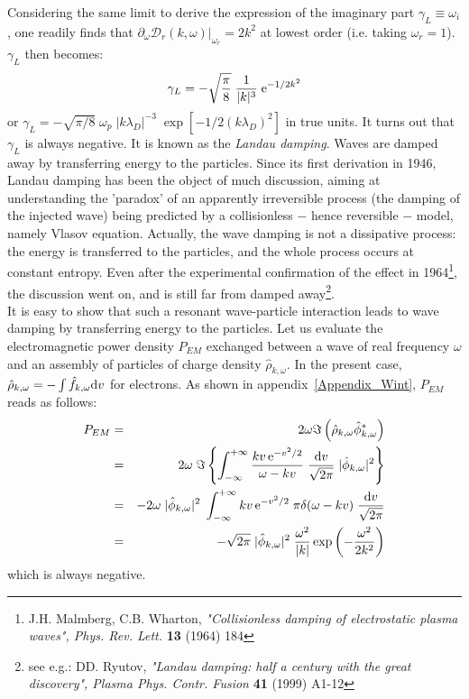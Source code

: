\documentclass[11pt]{article}
\newcommand{\dd}{\textrm d}
\newcommand{\ee}{\textrm e}
\newcommand{\beq}{\begin{equation}}
\newcommand{\eeq}{\end{equation}}
\newcommand{\beqas}{\begin{eqnarray*}}
\newcommand{\eeqas}{\end{eqnarray*}}
\begin{document}
Considering the same limit to derive the expression of the imaginary part $\gamma_L \equiv \omega_i$, one readily finds that $\left.\partial_\omega\mathcal{D}_r(k,\omega)\right|_{\omega_r} = 2k^2$ at lowest order (i.e. taking $\omega_r=1$). $\gamma_L$ then becomes:
\beq
\gamma_L = - \sqrt{\frac{\pi}{8}}\; \frac{1}{|k|^3}\; \ee^{-1/2k^2}
\eeq
or $\gamma_L = - \sqrt{\pi/8}\; \omega_p\; |k\lambda_D|^{-3}\; \exp\left[ -1/2(k\lambda_D)^2 \right]$ in true units. It turns out that $\gamma_L$ is always negative. It is
known as the \emph{Landau damping}. Waves are damped away by transferring
energy to the particles. Since its first derivation in 1946, Landau damping has been the object of much discussion, aiming at understanding the 'paradox' of an apparently irreversible process (the damping of the injected wave) being predicted by a collisionless $-$ hence reversible $-$ model, namely Vlasov equation. Actually, the wave damping is not a dissipative process: the energy is transferred to the particles, and the whole process occurs at constant entropy. Even after the experimental confirmation of the effect in 1964\footnote{ J.H. Malmberg, C.B. Wharton, \emph{"Collisionless damping of electrostatic plasma waves", Phys. Rev. Lett.} {\bf 13} (1964) 184}, the discussion went on, and is still far from damped away\footnote{ see e.g.: DD. Ryutov, \emph{"Landau damping: half a century with the great discovery", Plasma Phys. Contr. Fusion} {\bf 41} (1999) A1-12}. \\

It is easy to show that such a resonant wave-particle interaction leads to wave damping by transferring energy to the particles. Let us evaluate the electromagnetic power density $P_{EM}$ exchanged between a wave of real frequency $\omega$ and an assembly of particles of charge density $\hat \rho_{k,\omega}$. In the present case, $\hat \rho_{k,\omega} = -\int \hat f_{k,\omega}\dd v$ for electrons. As shown in appendix~\ref{Appendix_Wint}, $P_{EM}$ reads as follows:
\beqas
P_{EM} &=& 2\omega \Im\left(\hat \rho_{k,\omega}
\hat\phi_{k,\omega}^* \right) \\
&=& 2\omega\; \Im\left\{ \int_{-\infty}^{+\infty}
\frac{kv\, \ee^{-v^2/2}}{\omega-kv}
\; \frac{\dd v}{\sqrt{2\pi}}\; |\hat \phi_{k,\omega}|^2 \right\} \\
&=& -2\omega \; |\hat \phi_{k,\omega}|^2\; \int_{-\infty}^{+\infty}
kv\, \ee^{-v^2/2}\; \pi\delta(\omega-kv) \; \frac{\dd v}{\sqrt{2\pi}} \\
&=& -\sqrt{2\pi}\; |\hat \phi_{k,\omega}|^2\; \frac{\omega^2}{|k|}
\exp\left(-\frac{\omega^2}{2k^2}\right)
\eeqas
which is always negative.

\end{document}
